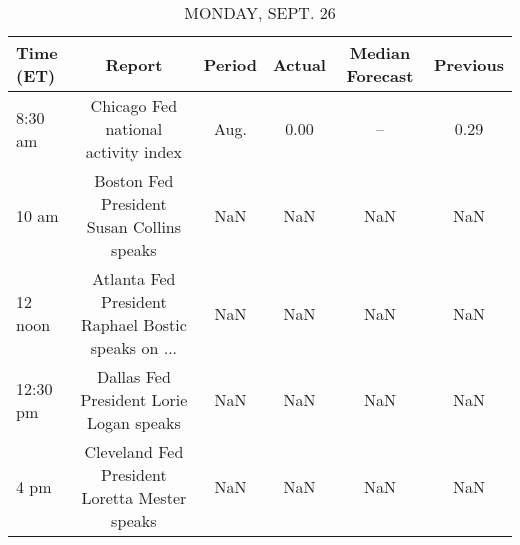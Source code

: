 \documentclass{book}
\begin{document}
  
  \begin{table}[htbp]%
  \caption{MONDAY, SEPT. 26}%
  \centering%
  \begin{adjustbox}{width=1\textwidth}%
  \begin{tabular}{lccccc}
  \toprule
  Time (ET) &                                             Report & Period & Actual & Median Forecast & Previous \\
  \midrule
    8:30 am &                Chicago Fed national activity index &   Aug. &   0.00 &              -- &     0.29 \\
      10 am &          Boston Fed President Susan Collins speaks &    NaN &    NaN &             NaN &      NaN \\
    12 noon & Atlanta Fed President Raphael Bostic speaks on ... &    NaN &    NaN &             NaN &      NaN \\
   12:30 pm &            Dallas Fed President Lorie Logan speaks &    NaN &    NaN &             NaN &      NaN \\
       4 pm &      Cleveland Fed President Loretta Mester speaks &    NaN &    NaN &             NaN &      NaN \\
  \bottomrule
  \end{tabular}
  \end{adjustbox}%
  \end{table}
  
  
\end{document}
